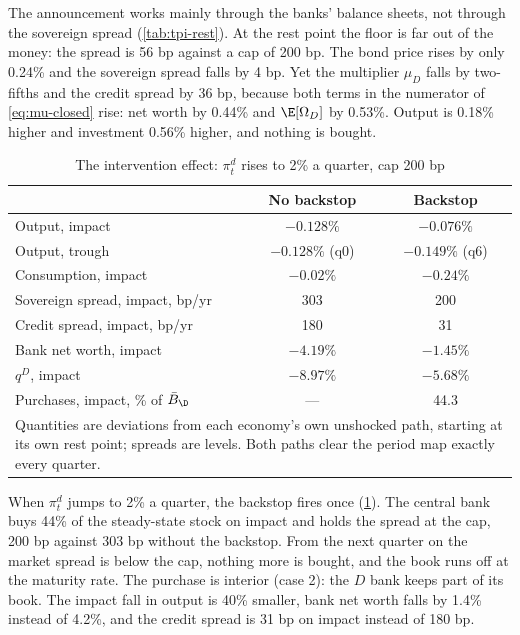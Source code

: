 The announcement works mainly through the banks' balance sheets, not through
the sovereign spread (\cref{tab:tpi-rest}). At the rest point the floor is far
out of the money: the spread is 56 bp against a cap of 200 bp. The bond price
rises by only 0.24\% and the sovereign spread falls by 4 bp. Yet the multiplier
$\mu_D$ falls by two-fifths and the credit spread by 36 bp, because both terms in
the numerator of \eqref{eq:mu-closed} rise: net worth by 0.44\% and
$\E[\Omega_D]$ by 0.53\%. Output is 0.18\% higher and investment 0.56\% higher,
and nothing is bought.

\begin{table}[ht]
\centering
\caption{The intervention effect: $\pi^{d}_t$ rises to 2\% a quarter, cap 200 bp}
\label{tab:tpi-shock}
\begin{tabular}{lcc}
\hline
 & No backstop & Backstop\\
\hline
Output, impact                              & $-0.128\%$ & $-0.076\%$\\
Output, trough                              & $-0.128\%$ (q0) & $-0.149\%$ (q6)\\
Consumption, impact                         & $-0.02\%$ & $-0.24\%$\\
Sovereign spread, impact, bp/yr             & 303 & 200\\
Credit spread, impact, bp/yr                & 180 & 31\\
Bank net worth, impact                      & $-4.19\%$ & $-1.45\%$\\
$q^{D}$, impact                             & $-8.97\%$ & $-5.68\%$\\
Purchases, impact, \% of $\bar B_\D$        & --- & 44.3\\
\hline
\multicolumn{3}{p{0.75\linewidth}}{\footnotesize Quantities are deviations
from each economy's own unshocked path, starting at its own rest point; spreads
are levels. Both paths clear the period map exactly every quarter.}
\end{tabular}
\end{table}

When $\pi^{d}_t$ jumps to 2\% a quarter, the backstop fires once
(\cref{tab:tpi-shock}). The central bank buys 44\% of the steady-state stock on
impact and holds the spread at the cap, 200 bp against 303 bp without the
backstop. From the next quarter on the market spread is below the cap, nothing
more is bought, and the book runs off at the maturity rate. The purchase is
interior (case 2): the $D$ bank keeps part of its book. The impact fall in output
is 40\% smaller, bank net worth falls by 1.4\% instead of 4.2\%, and the credit
spread is 31 bp on impact instead of 180 bp.

